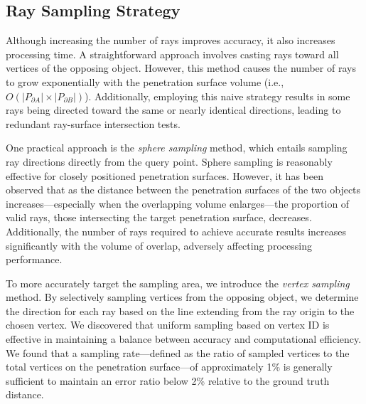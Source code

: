 

\subsection{Ray Sampling Strategy}\label{subsec:sampling}

Although increasing the number of rays improves accuracy, it also increases processing time.
A straightforward approach involves casting rays toward all vertices of the opposing object.
However, this method causes the number of rays to grow exponentially with the penetration surface volume (i.e., $O(|P_{\partial A}| \times |P_{\partial B}|)$).
Additionally, employing this naive strategy results in some rays being directed toward the same or nearly identical directions, leading to redundant ray-surface intersection tests.

One practical approach is the \textit{sphere sampling} method, which entails sampling ray directions directly from the query point.
Sphere sampling is reasonably effective for closely positioned penetration surfaces.
However, it has been observed that as the distance between the penetration surfaces of the two objects increases—especially when the overlapping volume enlarges—the proportion of valid rays, those intersecting the target penetration surface, decreases.
Additionally, the number of rays required to achieve accurate results increases significantly with the volume of overlap, adversely affecting processing performance.

To more accurately target the sampling area, we introduce the \textit{vertex sampling} method.
By selectively sampling vertices from the opposing object, we determine the direction for each ray based on the line extending from the ray origin to the chosen vertex.
We discovered that uniform sampling based on vertex ID is effective in maintaining a balance between accuracy and computational efficiency.
We found that a sampling rate—defined as the ratio of sampled vertices to the total vertices on the penetration surface—of approximately 1\% is generally sufficient to maintain an error ratio below 2\% relative to the ground truth distance. 

